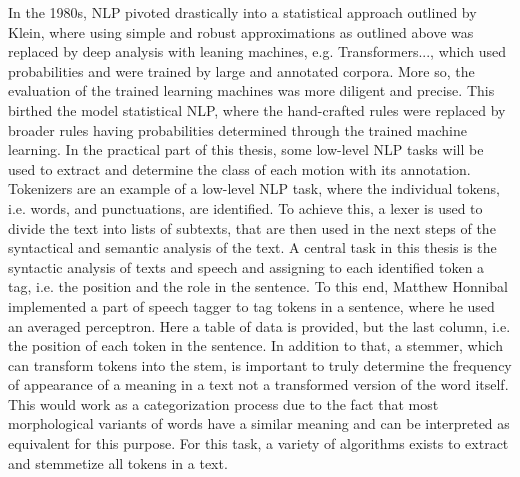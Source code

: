 		In the 1980s, NLP pivoted drastically into a statistical approach outlined by Klein\cite{kleincs}, where using simple and robust approximations as outlined above was replaced by deep analysis with leaning machines, e.g. Transformers..., which used probabilities and were trained by large and annotated corpora. More so, the evaluation of the trained learning machines was more diligent and precise\cite{nadkarni2011natural}. This birthed the model statistical NLP, where the hand-crafted rules were replaced by broader rules having probabilities determined through the trained machine learning\cite{kleincs}. In the practical part of this thesis, some low-level NLP tasks will be used to extract and determine the class of each motion with its annotation. Tokenizers are an example of a low-level NLP task, where the individual tokens, i.e. words, and punctuations, are identified. To achieve this, a lexer is used to divide the text into lists of subtexts, that are then used in the next steps of the syntactical and semantic analysis of the text.\newline
		A central task in this thesis is the syntactic analysis of texts and speech and assigning to each identified token a tag, i.e. the position and the role in the sentence\cite{nadkarni2011natural}. To this end, Matthew Honnibal implemented a part of speech tagger to tag tokens in a sentence, where he used an averaged perceptron. Here a table of data is provided, but the last column, i.e. the position of each token in the sentence\cite{honnibal_2013}. In addition to that, a stemmer, which can transform tokens into the stem, is important to truly determine the frequency of appearance of a meaning in a text not a transformed version of the word itself. This would work as a categorization process due to the fact that most morphological variants of words have a similar meaning and can be interpreted as equivalent for this purpose\cite{jivani2011comparative}. For this task, a variety of algorithms exists to extract and stemmetize all tokens in a text. 
